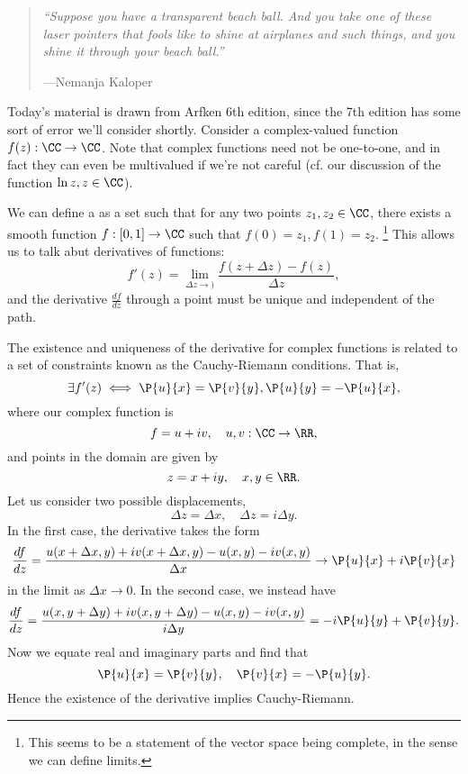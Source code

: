 \begin{quote}
    \textit{``Suppose you have a transparent beach ball. And you take one of these laser pointers that fools like to shine at airplanes and such things, and you shine it through your beach ball.''}
    
    ---Nemanja Kaloper
\end{quote}

Today's material is drawn from Arfken 6th edition, since the 7th edition has some sort of error we'll consider shortly. Consider a complex-valued function $f(z): \CC\to \CC$. Note that complex functions need not be one-to-one, and in fact they can even be multivalued if we're not careful (cf. our discussion of the function $\ln z, z\in \CC$).

We can define a  as a set such that for any two points $z_1,z_2\in \CC$, there exists a smooth function $f:[0,1] \to \CC$ such that $f(0) = z_1, f(1) =z_2$.%
    \footnote{This seems to be a statement of the vector space being complete, in the sense we can define limits.}
This allows us to talk abut derivatives of functions:
\begin{equation}
    f'(z) = \lim_{\Delta z \to )} \frac{f(z+\Delta z) - f(z)}{\Delta z},
\end{equation}
and the derivative $\frac{df}{dz}$ through a point must be unique and independent of the path.

The existence and uniqueness of the derivative for complex functions is related to a set of constraints known as the Cauchy-Riemann conditions. That is,
\begin{equation}
    \exists f'(z) \iff \P{u}{x} = \P{v}{y}, \P{u}{y} = - \P{u}{x},
\end{equation}
where our complex function is
\begin{equation}
    f = u+ iv,\quad u, v: \CC \to \RR,
\end{equation}
and points in the domain are given by
\begin{equation}
    z= x+ iy, \quad x,y \in \RR.
\end{equation}
Let us consider two possible displacements,
\begin{equation}
    \Delta z = \Delta x, \quad \Delta z = i\Delta y.
\end{equation}
In the first case, the derivative takes the form
\begin{equation}
    \frac{df}{dz} = \frac{u(x+\Delta x, y) + i v(x+ \Delta x,y) - u(x,y) - i v(x,y)}{\Delta x} \to \P{u}{x} + i \P{v}{x}
\end{equation}
in the limit as $\Delta x \to 0$. In the second case, we instead have
\begin{equation}
    \frac{df}{dz} = \frac{u(x,y+\Delta y)+iv(x,y+\Delta y) - u(x,y) - i v(x,y)}{i\Delta y} = -i\P{u}{y} + \P{v}{y}.
\end{equation}
Now we equate real and imaginary parts and find that
\begin{equation}
    \P{u}{x} = \P{v}{y}, \quad \P{v}{x} = -\P{u}{y}.
\end{equation}
Hence the existence of the derivative implies Cauchy-Riemann.

